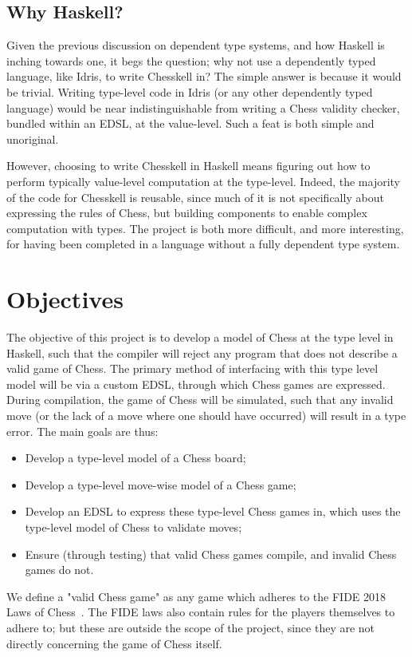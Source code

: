 \subsection{Why Haskell?}

Given the previous discussion on dependent type systems, and how Haskell is inching towards one, it begs the question; why not use a dependently typed language, like Idris, to write Chesskell in? The simple answer is because it would be trivial. Writing type-level code in Idris (or any other dependently typed language) would be near indistinguishable from writing a Chess validity checker, bundled within an EDSL, at the value-level. Such a feat is both simple and unoriginal.

However, choosing to write Chesskell in Haskell means figuring out how to perform typically value-level computation at the type-level. Indeed, the majority of the code for Chesskell is reusable, since much of it is not specifically about expressing the rules of Chess, but building components to enable complex computation with types. The project is both more difficult, and more interesting, for having been completed in a language without a fully dependent type system.

\section{Objectives} \label{introobjectives}

The objective of this project is to develop a model of Chess at the type level in Haskell, such that the compiler will reject any program that does not describe a valid game of Chess. The primary method of interfacing with this type level model will be via a custom EDSL, through which Chess games are expressed. During compilation, the game of Chess will be simulated, such that any invalid move (or the lack of a move where one should have occurred) will result in a type error. The main goals are thus:

\begin{itemize}
    \item Develop a type-level model of a Chess board;
    \item Develop a type-level move-wise model of a Chess game;
    \item Develop an EDSL to express these type-level Chess games in, which uses the type-level model of Chess to validate moves;
    \item Ensure (through testing) that valid Chess games compile, and invalid Chess games do not.
\end{itemize}

We define a "valid Chess game" as any game which adheres to the FIDE 2018 Laws of Chess~\cite{lawsofchess}. The FIDE laws also contain rules for the players themselves to adhere to; but these are outside the scope of the project, since they are not directly concerning the game of Chess itself.

